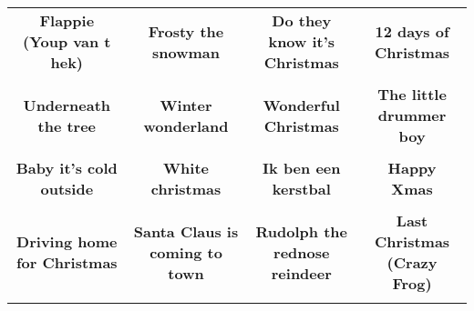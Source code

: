 \documentclass[12pt]{article} \usepackage{eso-pic, graphicx}
\newcommand{\background}[1]{%
\AddToShipoutPictureBG*{\texttt{[image: \#1]}}
}
\begin{document}
\tabcolsep=30.2pt \renewcommand{\arraystretch}{4.5}   \vspace*{4.3cm} \begin{center}  \begin{tabular}{c c c c}
\parbox{3cm}{\centering \textbf{Flappie (Youp van t hek)}}& 
\parbox{3cm}{\centering \textbf{Frosty the snowman}}& 
\parbox{3cm}{\centering \textbf{Do they know it's Christmas}}& 
\parbox{3cm}{\centering \textbf{12 days of Christmas}}\\ \\ 
\parbox{3cm}{\centering \textbf{Underneath the tree}}& 
\parbox{3cm}{\centering \textbf{Winter wonderland}}& 
\parbox{3cm}{\centering \textbf{Wonderful Christmas}}& 
\parbox{3cm}{\centering \textbf{The little drummer boy}}\\ \\ 
\parbox{3cm}{\centering \textbf{Baby it’s cold outside}}& 
\parbox{3cm}{\centering \textbf{White christmas}}& 
\parbox{3cm}{\centering \textbf{Ik ben een kerstbal}}& 
\parbox{3cm}{\centering \textbf{Happy Xmas}}\\ \\ 
\parbox{3cm}{\centering \textbf{Driving home for Christmas}}& 
\parbox{3cm}{\centering \textbf{Santa Claus is coming to town}}& 
\parbox{3cm}{\centering \textbf{Rudolph the rednose reindeer}}& 
\parbox{3cm}{\centering \textbf{Last Christmas (Crazy Frog)}}\\ \\ 
\end{tabular} \background{discobingo.pdf} \end{center} 
\end{document}
